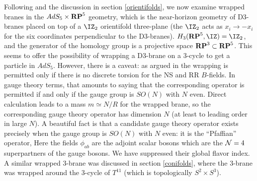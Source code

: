 Following \cite{Witten:1998xy} and the discussion in section
\ref{orientifolds}, we now examine wrapped branes in the $AdS_5
\times {\bf RP}^5$ geometry, which is the near-horizon geometry of
D3-branes placed on top of a $\IZ_2$ orientifold three-plane (the
$\IZ_2$ acts as $x_i \to -x_i$ for the six coordinates perpendicular to the
D3-branes).  
%
$H_3({\bf RP}^5,\IZ) = \IZ_2$, and the generator of the homology
group is a projective space ${\bf RP}^3 \subset {\bf RP}^5$.  This seems to
offer the possibility of wrapping a D3-brane on a 3-cycle to get a particle
in $AdS_5$.  However, there is a caveat: as argued in \cite{Witten:1998xy}
the wrapping is permitted only if there is no discrete torsion for the NS
and RR $B$-fields.  In gauge theory terms, that amounts to saying that the
corresponding operator is permitted if and only if 
the gauge group is $SO(N)$ with $N$
even.  Direct calculation leads to a mass $m \simeq N/R$ for the wrapped brane,
so the corresponding gauge theory operator has dimension $N$ (at least to
leading order in large $N$).  A beautiful fact is that a candidate gauge
theory operator exists precisely when the gauge group is $SO(N)$ with $N$
even: it is the ``Pfaffian'' operator, 
 Here the fields $\phi_{ab}$ are the adjoint scalar bosons which are the
${\cal N}=4$ superpartners of the gauge bosons.  We have suppressed their
global flavor index. A similar wrapped 3-brane was discussed in section
\ref{conifolds}, where the 3-brane was wrapped around the 3-cycle of
$T^{11}$ (which is topologically $S^2\times S^3$).

